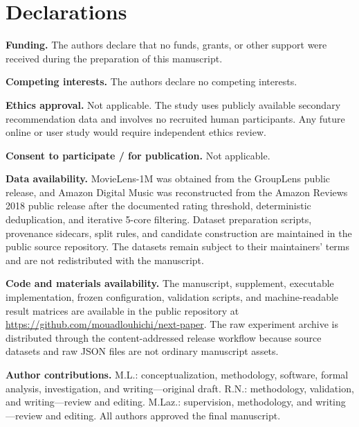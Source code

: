 \documentclass[pdflatex,sn-mathphys-num]{sn-jnl}
\begin{document}
\backmatter

\section*{Declarations}
\textbf{Funding.} The authors declare that no funds, grants, or other support were received during the preparation of this manuscript.

\textbf{Competing interests.} The authors declare no competing interests.

\textbf{Ethics approval.} Not applicable. The study uses publicly available secondary recommendation data and involves no recruited human participants. Any future online or user study would require independent ethics review.

\textbf{Consent to participate / for publication.} Not applicable.

\textbf{Data availability.} MovieLens-1M was obtained from the GroupLens public release, and Amazon Digital Music was reconstructed from the Amazon Reviews 2018 public release after the documented rating threshold, deterministic deduplication, and iterative 5-core filtering. Dataset preparation scripts, provenance sidecars, split rules, and candidate construction are maintained in the public source repository. The datasets remain subject to their maintainers' terms and are not redistributed with the manuscript.

\textbf{Code and materials availability.} The manuscript, supplement, executable implementation, frozen configuration, validation scripts, and machine-readable result matrices are available in the public repository at \url{https://github.com/mouadlouhichi/next-paper}. The raw experiment archive is distributed through the content-addressed release workflow because source datasets and raw JSON files are not ordinary manuscript assets.

\textbf{Author contributions.} M.L.: conceptualization, methodology, software, formal analysis, investigation, and writing---original draft. R.N.: methodology, validation, and writing---review and editing. M.Laz.: supervision, methodology, and writing---review and editing. All authors approved the final manuscript.


\appendix
\setcounter{section}{0}
\renewcommand{\thesection}{\Alph{section}}
\renewcommand{\thesubsection}{\thesection.\arabic{subsection}}
\renewcommand{\thetable}{\thesection\arabic{table}}
\renewcommand{\theequation}{\thesection\arabic{equation}}
\renewcommand{\theHsection}{appendix.\Alph{section}}
\renewcommand{\theHtable}{appendix.\Alph{section}.\arabic{table}}
\renewcommand{\theHequation}{appendix.\Alph{section}.\arabic{equation}}
\setcounter{table}{0}
\setcounter{equation}{0}
\end{document}
